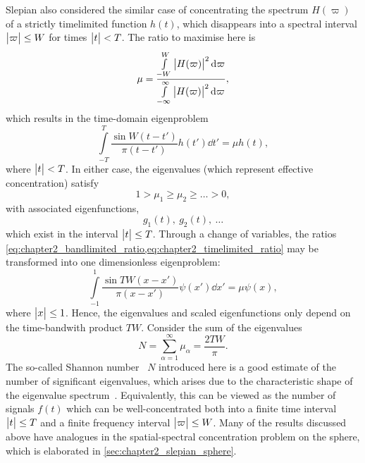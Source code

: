 Slepian also considered the similar case of concentrating the spectrum \(H(\varpi)\) of a strictly timelimited function \(h(t)\), which disappears into a spectral interval \(\big\lvert\varpi\big\rvert \leq W\) for times \(\big\lvert t\big\rvert < T\).
The ratio to maximise here is
%
\begin{equation}\label{eq:chapter2_timelimited_ratio}
	\mu
	= \frac{\int\limits_{-W}^{W} \big\lvert H(\varpi)\big\rvert^{2} \dd{\varpi}}{\int\limits_{-\infty}^{\infty} \big\lvert H(\varpi)\big\rvert^{2} \dd{\varpi}},
\end{equation}
%
which results in the time-domain eigenproblem
%
\begin{equation}
	\int\limits_{-T}^{T} \frac{\sin W(t-t')}{\pi(t-t')} h(t') \dd{t'}
	= \mu h(t),
\end{equation}
%
where \(\big\lvert t\big\rvert < T\).
In either case, the eigenvalues (which represent effective concentration) satisfy
%
\begin{equation}
	1 > \mu_{1} \geq \mu_{2} \geq \ldots > 0, %
\end{equation}
%
with associated eigenfunctions, \eg{}
%
\begin{equation}
	g_{1}(t),\ g_{2}(t),\ \ldots
\end{equation}
%
which exist in the interval \(\big\lvert t\big\rvert \leq T\).
Through a change of variables, the ratios \cref{eq:chapter2_bandlimited_ratio,eq:chapter2_timelimited_ratio} may be transformed into one dimensionless eigenproblem:
%
\begin{equation}
	\int\limits_{-1}^{1} \frac{\sin TW(x-x')}{\pi(x-x')} \psi(x') \dd{x'}
	= \mu \psi(x),
\end{equation}
%
where \(\big\lvert x\big\rvert \leq 1\).
Hence, the eigenvalues and scaled eigenfunctions only depend on the time-bandwith product \(TW\).
Consider the sum of the eigenvalues
%
\begin{equation}
	N
	= \sum\limits_{\alpha=1}^{\infty} \mu_{\alpha}
	= \frac{2TW}{\pi}.
\end{equation}
%
The so-called Shannon number~\cite{Percival1993} \(N\) introduced here is a good estimate of the number of significant eigenvalues, which arises due to the characteristic shape of the eigenvalue spectrum~\cite{Landau1965,Slepian1965}.
Equivalently, this can be viewed as the number of signals \(f(t)\) which can be well-concentrated both into a finite time interval \(\big\lvert t\big\rvert \leq T\) and a finite frequency interval \(\big\lvert\varpi\big\rvert \leq W\).
Many of the results discussed above have analogues in the spatial-spectral concentration problem on the sphere, which is elaborated in \cref{sec:chapter2_slepian_sphere}.

